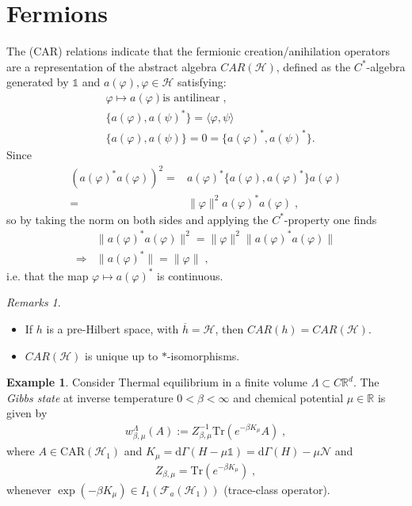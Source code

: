 \documentclass[
a4paper, %
11pt, %
onecolumn, %
openany, %
]{memoir}
\theoremstyle{definition}
\newtheorem{example}{Example}[chapter]
\theoremstyle{remark}
\newtheorem{remarks}{Remarks}[chapter]
\theoremstyle{plain}
\begin{document}
\section{Fermions}
The (CAR) relations indicate that the fermionic creation/anihilation operators are a representation of the abstract algebra $CAR(\mathcal{H})$, defined as the $C^*$-algebra generated by $\mathds{1}$ and $a(\varphi), \varphi\in\mathcal{H}$ satisfying: \begin{align}
	&\varphi\mapsto a(\varphi) \text{is antilinear}\; ,\\
	&\{a(\varphi),a(\psi)^*\}=\langle\varphi,\psi\rangle \label{eqn::comm_car}\\
	&\{a(\varphi), a(\psi)\} =0=\{a(\varphi)^*,a(\psi)^*\}. 
\end{align}
Since \begin{align}
(a(\varphi)^*a(\varphi))^2=&a(\varphi)^*\{a(\varphi),a(\varphi)^*\}a(\varphi)\\
=&\|\varphi\|^2a(\varphi)^*a(\varphi)\;,\end{align}
so by taking the norm on both sides and applying the $C^*$-property one finds \begin{align}
&\|a(\varphi)^*a(\varphi)\|^2=\|\varphi\|^2\|a(\varphi)^*a(\varphi)\|\\
\Rightarrow&\|a(\varphi)^*\|=\|\varphi\|\; ,
\end{align}
i.e. that the map $\varphi\mapsto a(\varphi)^*$ is continuous. \begin{remarks}
	\begin{itemize}
		\item If $h$ is a pre-Hilbert space, with $\overline{h}=\mathcal{H}$, then $CAR(h)=CAR(\mathcal{H})$.
		\item $CAR(\mathcal{H})$ is unique up to $*$-isomorphisms.
	\end{itemize}
\end{remarks}
\begin{example} Consider Thermal equilibrium in a finite volume $\Lambda \subset C\mathbb{R}^d$. The \textit{Gibbs state} at inverse temperature $0<\beta<\infty$ and chemical potential $\mu\in\mathbb{R}$ is given by \begin{align}
w_{\beta,\mu}^{\Lambda}(A):=Z^{-1}_{\beta,\mu} \mathrm{Tr}(e^{-\beta K_{\mu}}A)\; ,\label{Eqn::def_gibbs_state}
\end{align}
where $A\in \mathrm{CAR}(\mathcal{H}_1)$ and $K_{\mu}=\mathrm{d}\Gamma(H-\mu\mathds{1})=\mathrm{d}\Gamma(H)-\mu\mathcal{N}$ and \begin{align}
Z_{\beta,\mu}=\mathrm{Tr}(e^{-\beta K_{\mu}})\; ,
\end{align}
whenever $\exp(-\beta K_{\mu})\in I_1(\mathcal{F}_a(\mathcal{H}_1))$ (trace-class operator).\end{example}
\end{document}
